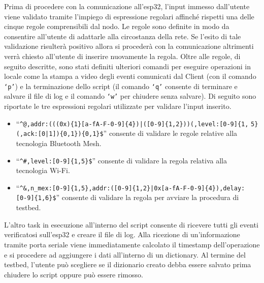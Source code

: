 \noindent Prima di procedere con la comunicazione all'esp32, l'input immesso dall'utente viene validato tramite l'impiego di espressione regolari affinché rispetti una delle cinque regole comprensibili dal nodo. Le regole sono definite in modo da consentire all'utente di adattarle alla circostanza della rete. Se l'esito di tale validazione risulterà positivo allora si procederà con la comunicazione altrimenti verrà chiesto all'utente di inserire nuovamente la regola. Oltre alle regole, di seguito descritte, sono stati definiti ulteriori comandi per eseguire operazioni in locale come la stampa a video degli eventi comunicati dal Client (con il comando \texttt{`p'}) e la terminazione dello script (il comando \texttt{`q'} consente di terminare e salvare il file di log e il comando \texttt{`w'} per chiudere senza salvare). Di seguito sono riportate le tre espressioni regolari utilizzate per validare l'input inserito.

\begin{itemize}
    \item ``\verb/^@,addr:(((0x){1}[a-fA-F-0-9]{4})|([0-9]{1,2}))(,level:[0-9]{1,/  \verb/5}(,ack:[0|1]){0,1}){0,1}$/'' consente di validare le regole relative alla tecnologia Bluetooth Mesh.
    
    \item ``\verb/^#,level:[0-9]{1,5}$/'' consente di validare la regola relativa alla tecnologia Wi-Fi.
    
    \item ``\verb/^&,n_mex:[0-9]{1,5},addr:([0-9]{1,2}|0x[a-fA-F-0-9]{4}),delay:/\\  \verb/[0-9]{1,6}$/'' consente di validare la regola per avviare la procedura di testbed.
\end{itemize}

\noindent L'altro task in esecuzione all'interno del script consente di ricevere tutti gli eventi verificatosi sull'esp32 e creare il file di log. Alla ricezione di un'informazione tramite porta seriale viene immediatamente calcolato il timestamp dell'operazione e si procedere ad aggiungere i dati all'interno di un dictionary. Al termine del testbed, l'utente può scegliere se il dizionario creato debba essere salvato prima chiudere lo script oppure può essere rimosso. 

